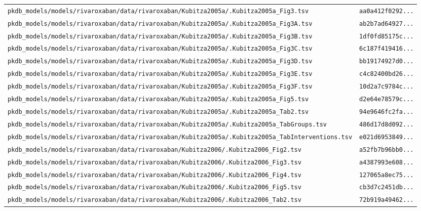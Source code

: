 \begin{longtable}{ll}
\texttt{pkdb\_models/models/rivaroxaban/data/rivaroxaban/Kubitza2005a/.Kubitza2005a\_Fig3.tsv} & \texttt{aa0a412f0292...} \\
\texttt{pkdb\_models/models/rivaroxaban/data/rivaroxaban/Kubitza2005a/.Kubitza2005a\_Fig3A.tsv} & \texttt{ab2b7ad64927...} \\
\texttt{pkdb\_models/models/rivaroxaban/data/rivaroxaban/Kubitza2005a/.Kubitza2005a\_Fig3B.tsv} & \texttt{1df0fd85175c...} \\
\texttt{pkdb\_models/models/rivaroxaban/data/rivaroxaban/Kubitza2005a/.Kubitza2005a\_Fig3C.tsv} & \texttt{6c187f419416...} \\
\texttt{pkdb\_models/models/rivaroxaban/data/rivaroxaban/Kubitza2005a/.Kubitza2005a\_Fig3D.tsv} & \texttt{bb19174927d0...} \\
\texttt{pkdb\_models/models/rivaroxaban/data/rivaroxaban/Kubitza2005a/.Kubitza2005a\_Fig3E.tsv} & \texttt{c4c82400bd26...} \\
\texttt{pkdb\_models/models/rivaroxaban/data/rivaroxaban/Kubitza2005a/.Kubitza2005a\_Fig3F.tsv} & \texttt{10d2a7c9784c...} \\
\texttt{pkdb\_models/models/rivaroxaban/data/rivaroxaban/Kubitza2005a/.Kubitza2005a\_Fig5.tsv} & \texttt{d2e64e78579c...} \\
\texttt{pkdb\_models/models/rivaroxaban/data/rivaroxaban/Kubitza2005a/.Kubitza2005a\_Tab2.tsv} & \texttt{94e9646fc2fa...} \\
\texttt{pkdb\_models/models/rivaroxaban/data/rivaroxaban/Kubitza2005a/.Kubitza2005a\_TabGroups.tsv} & \texttt{486d17d8d092...} \\
\texttt{pkdb\_models/models/rivaroxaban/data/rivaroxaban/Kubitza2005a/.Kubitza2005a\_TabInterventions.tsv} & \texttt{e021d6953849...} \\
\texttt{pkdb\_models/models/rivaroxaban/data/rivaroxaban/Kubitza2006/.Kubitza2006\_Fig2.tsv} & \texttt{a52fb7b96bb0...} \\
\texttt{pkdb\_models/models/rivaroxaban/data/rivaroxaban/Kubitza2006/.Kubitza2006\_Fig3.tsv} & \texttt{a4387993e608...} \\
\texttt{pkdb\_models/models/rivaroxaban/data/rivaroxaban/Kubitza2006/.Kubitza2006\_Fig4.tsv} & \texttt{127065a8ec75...} \\
\texttt{pkdb\_models/models/rivaroxaban/data/rivaroxaban/Kubitza2006/.Kubitza2006\_Fig5.tsv} & \texttt{cb3d7c2451db...} \\
\texttt{pkdb\_models/models/rivaroxaban/data/rivaroxaban/Kubitza2006/.Kubitza2006\_Tab2.tsv} & \texttt{72b919a49462...} \\

\end{longtable}
